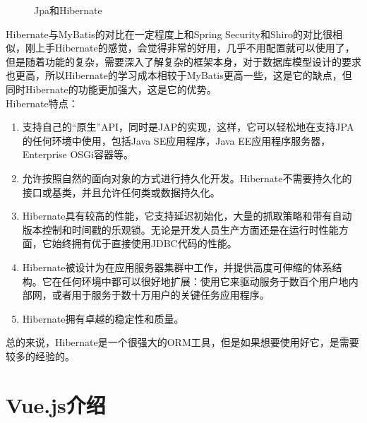 \begin{enumerate}
\begin{figure}[h]
              \caption{\song\wuhao Jpa和Hibernate}
              \label{JpaAndHibernate}
          \end{figure}
          Hibernate与MyBatis的对比在一定程度上和Spring Security和Shiro的对比很相似，刚上手Hibernate的感觉，会觉得非常的好用，几乎不用配置就可以使用了，但是随着功能的复杂，需要深入了解复杂的框架本身，对于数据库模型设计的要求也更高，所以Hibernate的学习成本相较于MyBatis更高一些，这是它的缺点，但同时Hibernate的功能更加强大，这是它的优势。\\
          Hibernate特点：
          \begin{enumerate}
              \item 支持自己的“原生”API，同时是JAP的实现，这样，它可以轻松地在支持JPA的任何环境中使用，包括Java SE应用程序，Java EE应用程序服务器，Enterprise OSGi容器等。
              \item 允许按照自然的面向对象的方式进行持久化开发。Hibernate不需要持久化的接口或基类，并且允许任何类或数据持久化。
              \item Hibernate具有较高的性能，它支持延迟初始化，大量的抓取策略和带有自动版本控制和时间戳的乐观锁。无论是开发人员生产方面还是在运行时性能方面，它始终拥有优于直接使用JDBC代码的性能。
              \item Hibernate被设计为在应用服务器集群中工作，并提供高度可伸缩的体系结构。它在任何环境中都可以很好地扩展：使用它来驱动服务于数百个用户地内部网，或者用于服务于数十万用户的关键任务应用程序。
              \item Hibernate拥有卓越的稳定性和质量。
          \end{enumerate}
          总的来说，Hibernate是一个很强大的ORM工具，但是如果想要使用好它，是需要较多的经验的。
\end{enumerate}

\section{Vue.js介绍}

